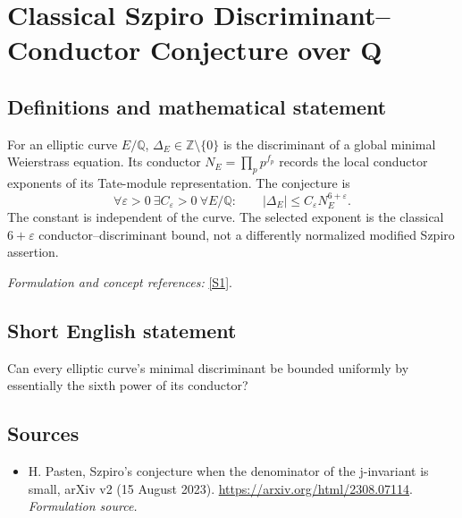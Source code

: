 \documentclass[11pt]{article}
\begin{document}
\section*{\texorpdfstring{Classical Szpiro Discriminant–Conductor Conjecture over Q}{Classical Szpiro Discriminant–Conductor Conjecture over Q}}\label{105}
\subsection{Definitions and mathematical statement}
For an elliptic curve $E/{\mathbb{Q}}$, $\Delta_E\in{\mathbb{Z}}\setminus\{0\}$ is the discriminant of a global minimal Weierstrass equation. Its conductor $N_E=\prod_p p^{f_p}$ records the local conductor exponents of its Tate-module representation. The conjecture is
\[
 \forall\varepsilon>0\ \exists C_\varepsilon>0\ \forall E/{\mathbb{Q}}:\qquad
 |\Delta_E|\le C_\varepsilon N_E^{6+\varepsilon}.
\]
The constant is independent of the curve. The selected exponent is the classical $6+\varepsilon$ conductor--discriminant bound, not a differently normalized modified Szpiro assertion.
\par\smallskip\textit{Formulation and concept references:} \href{https://arxiv.org/html/2308.07114}{[S1]}.

\subsection{Short English statement}
Can every elliptic curve's minimal discriminant be bounded uniformly by essentially the sixth power of its conductor?
\subsection{Sources}
\begin{itemize}
\item[S1]H. Pasten, Szpiro's conjecture when the denominator of the j-invariant is small, arXiv v2 (15 August 2023).
\url{https://arxiv.org/html/2308.07114}.
\textit{Formulation source.}
\end{itemize}
\end{document}
